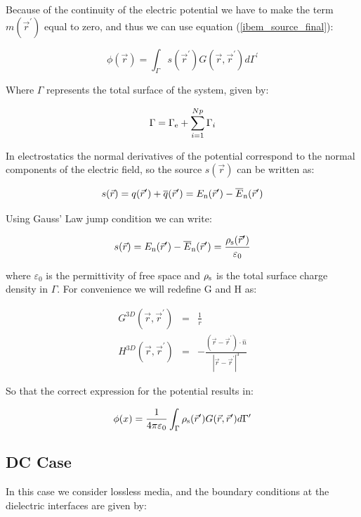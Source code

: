 \documentclass[12pt]{report}
\begin{document}
Because of the continuity of the electric potential we have to make the term $m(\vec{r}^\prime)$ equal to zero, and thus we can use equation (\ref{ibem_source_final}):

\begin{equation}
\phi(\vec{r})=\int_\Gamma{s(\vec{r}^\prime)G(\vec{r},\vec{r}^\prime)d\Gamma^\prime}\label{ibem_source}
\end{equation}

Where $\Gamma$ represents the total surface of the system, given by:

\begin{equation}
\Gamma=\Gamma_{\rm{e}}+\sum_{i=1}^{Np}\Gamma_i
\end{equation}
 
In electrostatics the normal derivatives of the potential correspond to the normal components of the electric field, so the source $s(\vec{r})$ can be written as:

\begin{equation}
s(\vec{r})=q(\vec{r}^\prime)+\overline{q}(\vec{r}^\prime)=E_{\rm n}(\vec{r}^\prime)-\overline{E}_{\rm n}(\vec{r}^\prime)
\end{equation}

Using Gauss' Law jump condition we can write:

\begin{equation}
s(\vec{r})=E_{\rm n}(\vec{r}^\prime)-\overline{E}_{\rm n}(\vec{r}^\prime)=\frac{\rho_{\rm s}(\vec{r}^\prime)}{\varepsilon_0}
\end{equation}

where $\varepsilon_0$ is the permittivity of free space and $\rho_{\rm s}$ is the total surface charge density in $\Gamma$. For convenience we will redefine G and H as:

\begin{eqnarray}
G^{3D}(\vec{r},\vec{r}^\prime)&=&\frac{1}{r}\label{green}\\
H^{3D}(\vec{r},\vec{r}^\prime)&=&-\frac{(\vec{r}-\vec{r}^\prime)\cdot\hat{n}}{|\vec{r}-\vec{r}^\prime|^3}
\end{eqnarray}

So that the correct expression for the potential results in:

\begin{equation}
\phi(x)=\frac{1}{4\pi\varepsilon_0}\int_\Gamma{\rho_{\rm s}(\vec{r}^\prime)G(\vec{r},\vec{r}^\prime)d\Gamma^\prime}\label{pot_electrostatic}
\end{equation}

\subsection{DC Case}\label{sec_dc}
In this case we consider lossless media, and the boundary conditions at the dielectric interfaces are given by:
\end{document}

